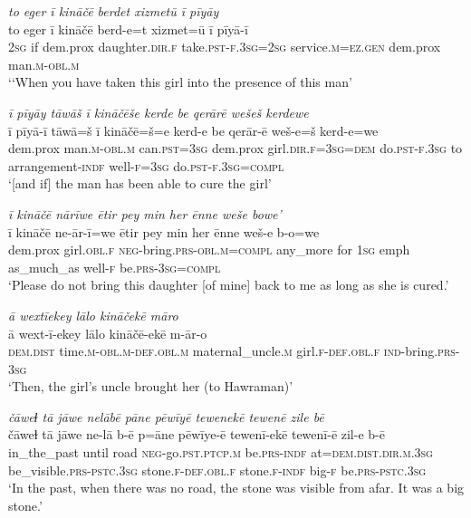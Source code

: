 \ea \label{ZP.44}
\textit{to eger ī kināčē berdet xizmetū ī pīyāy} \\ 
\gll to eger ī kināčē berd-e=t xizmet=ū ī pīyā-ī \\ 
 \textsc{2sg} if dem.prox daughter\textsc{.dir}\textsc{.f} take\textsc{.pst}\textsc{-f}\textsc{.3sg}\textsc{=\textsc{2sg}} service\textsc{.m}\textsc{\textsc{=ez.gen}} dem.prox man\textsc{.m}\textsc{-obl}\textsc{.m} \\ 
\glt `‘When you have taken this girl into the presence of this man'
\z 
 
\ea \label{ZP.45}
\textit{ī pīyāy tāwāš ī kināčēše kerde be qerārē wešeš kerdewe} \\ 
\gll ī pīyā-ī tāwā=š ī kināčē=š=e kerd-e be qerār-ē weš-e=š kerd-e=we \\ 
 dem.prox man\textsc{.m}\textsc{-obl}\textsc{.m} can\textsc{.pst}\textsc{=3sg} dem.prox girl\textsc{.dir}\textsc{.f}\textsc{=3sg}\textsc{=dem} do\textsc{.pst}\textsc{-f}\textsc{.3sg} to arrangement\textsc{-indf} well\textsc{-f}\textsc{=3sg} do\textsc{.pst}\textsc{-f}\textsc{.3sg}\textsc{=compl} \\ 
\glt `[and if] the man has been able to cure the girl'
\z 
 
\ea \label{ZP.48}
\textit{ī kināčē nārīwe ētir pey min her ēnne weše bowe’} \\ 
\gll ī kināčē ne-ār-ī=we ētir pey min her ēnne weš-e b-o=we \\ 
 dem.prox girl\textsc{.obl}\textsc{.f} \textsc{neg-}bring\textsc{.prs}\textsc{-obl}\textsc{.m}\textsc{=compl} any\_more for \textsc{1sg} emph as\_much\_as well\textsc{-f} be\textsc{.prs}\textsc{-3sg}\textsc{=compl} \\ 
\glt `Please do not bring this daughter [of mine] back to me as long as she is cured.'
\z 
 
\ea \label{ZP.49}
\textit{ā wextīekey lālo kināčekē māro} \\ 
\gll ā wext-ī-ekey lālo kināčē-ekē m-ār-o \\ 
 \textsc{dem.dist} time\textsc{.m}\textsc{-obl}\textsc{.m}\textsc{-def}\textsc{.obl}\textsc{.m} maternal\_uncle\textsc{.m} girl\textsc{.f}\textsc{-def}\textsc{.obl}\textsc{.f} \textsc{ind-}bring\textsc{.prs}\textsc{-3sg} \\ 
\glt `Then, the girl’s uncle brought her (to Hawraman)'
\z 
 
\ea \label{ZP.54}
\textit{čāweɫ tā jāwe nelābē pāne pēwīyē tewenekē tewenē zile bē} \\ 
\gll čāweɫ tā jāwe ne-lā b-ē p=āne pēwīye-ē tewenī-ekē tewenī-ē zil-e b-ē \\ 
 in\_the\_past until road \textsc{neg-}go\textsc{.pst}\textsc{.ptcp}\textsc{.m} be\textsc{.prs}\textsc{-indf} at=\textsc{dem.dist}\textsc{.dir}\textsc{.m}\textsc{.3sg} be\_visible\textsc{.prs}\textsc{-pstc}\textsc{.3sg} stone\textsc{.f}\textsc{-def}\textsc{.obl}\textsc{.f} stone\textsc{.f}\textsc{-indf} big\textsc{-f} be\textsc{.prs}\textsc{-pstc}\textsc{.3sg} \\ 
\glt `In the past, when there was no road, the stone was visible from afar. It was a big stone.'
\z 
 
